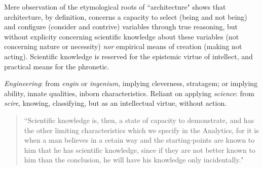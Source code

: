 Mere observation of the etymological roots of ``architecture" shows that architecture, by definition, concerns a capacity to select (being and not being) and configure (consider and contrive) variables through true reasoning, but without explicity concerning scientific knowledge about these variables (not concerning nature or necessity) \textit{nor} empirical means of creation (making not acting). Scientific knowledge is reserved for the epistemic virtue of intellect, and practical means for the phronetic.

\textit{Engineering}: from \textit{engin} or \textit{ingenium}, implying cleverness, stratagem; or implying ability, innate qualities, inborn characteristics. Reliant on applying \textit{science}: from \textit{scire}, knowing, classifying, but as an intellectual virtue, without action.

\begin{quote}
``Scientific knowledge is, then, a state of capacity to demonstrate, and has the other limiting characteristics which we specify in the Analytics, for it is when a man believes in a cetain way and the starting-points are known to him that he has scientific knowledge, since if they are not better known to him than the conclusion, he will have his knowledge only incidentally." \cite[p105]{NICOMACHEANETHICS}
\end{quote}











